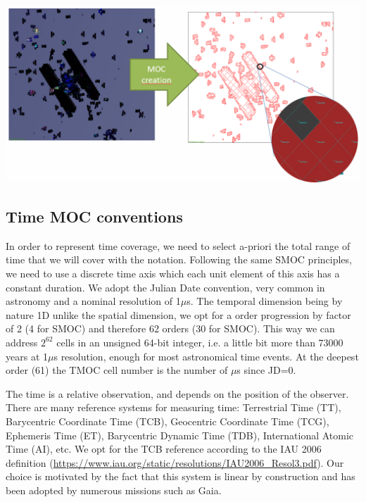 \documentclass[11pt,a4paper]{ivoa}
\begin{document}
\begin{adjustbox}{center,caption={SMOC: from the image
      to the list of numbers based on HEALPix hierarchy tessellation},
    label={fig:smoc-view},nofloat=figure,vspace=\bigskipamount}
\includegraphics[width=\textwidth]{smoc_view.png}
\end{adjustbox}




\subsection{Time MOC conventions}
\label{sec:tmoc1}


In order to represent time coverage, we need to select a-priori the
total range of time that we will cover with the notation. Following
the same SMOC principles, we need to use a discrete time axis which
each unit element of this axis has a constant duration. We adopt
the Julian Date convention, very common in astronomy and a nominal
resolution of 1$\mu$s. The temporal dimension being by nature 1D unlike
the spatial dimension, we opt for a order progression by factor of
2 (4 for SMOC) and therefore 62 orders (30 for SMOC). This way we
can address $2^{62}$ cells in an unsigned 64-bit integer,
i.e. a little bit more than 73000 years at
1$\mu$s resolution, enough for most astronomical time events. At the
deepest order (61) the TMOC cell number is the number of $\mu$s since
JD=0.

The time is a relative observation, and depends on the position of the
observer. There are many reference systems for measuring time:
Terrestrial Time (TT), Barycentric Coordinate Time (TCB), Geocentric
Coordinate Time (TCG), Ephemeris Time (ET), Barycentric Dynamic Time
(TDB), International Atomic Time (AI), etc. We opt for the TCB
reference according to the IAU 2006 definition
(\url{https://www.iau.org/static/resolutions/IAU2006_Resol3.pdf}). Our
choice is motivated by the fact that this system is linear by
construction and has been adopted by numerous missions such as Gaia.
\end{document}
